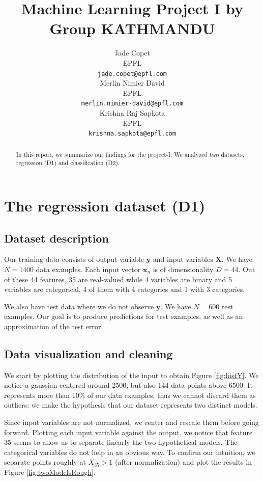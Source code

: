 \documentclass{article} %
\title{Machine Learning Project I by Group KATHMANDU}
\author{
Jade Copet\\
EPFL \\
\texttt{jade.copet@epfl.com} \\
\And
Merlin Nimier David\\
EPFL \\
\texttt{merlin.nimier-david@epfl.com} \\
\And
Krishna Raj Sapkota\\
EPFL \\
\texttt{krishna.sapkota@epfl.com} \\
}
\begin{document}
\maketitle



\begin{abstract}
  In this report, we summarize our findings for the project-I. We analyzed two datasets, regression (D1) and classification (D2).
\end{abstract}



\section{The regression dataset (D1)}

  \subsection{Dataset description}
  Our training data consists of output variable $\mathbf{y}$ and input variables $\mathbf{X}$. We have $N = 1400$ data examples. Each input vector $\mathbf{x}_n$ is of dimensionality $D = 44$. Out of these 44 features, 35 are real-valued while 4 variables are binary and 5 variables are categorical, 4 of them with 4 categories and 1 with 3 categories.

  We also have test data where we do not observe $\mathbf{y}$. We have $N = 600$ test examples. Our goal is to produce predictions for test examples, as well as an approximation of the test error.

  \subsection{Data visualization and cleaning}
  We start by plotting the distribution of the input to obtain Figure \ref{fig:histY}. We notice a gaussian centered around 2500, but also 144 data points above 6500. It represents more than 10\% of our data examples, thus we cannot discard them as outliers: we make the hypothesis that our dataset represents two distinct models.

  Since input variables are not normalized, we center and rescale them before going forward. Plotting each input variable against the output, we notice that feature 35 seems to allow us to separate linearly the two hypothetical models. The categorical variables do not help in an obvious way. To confirm our intuition, we separate points roughly at $X_{35} > 1$ (after normalization) and plot the results in Figure \ref{fig:twoModelsRough}.
\end{document}
